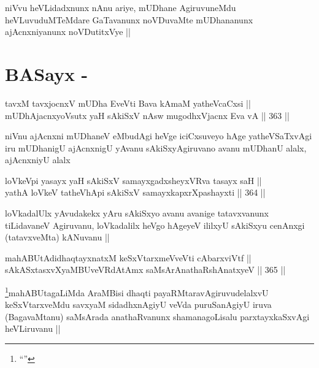\begin{artha}
niVvu heVLidadxnunx nAnu ariye, mUDhane AgiruvuneMdu heVLuvuduMTeMdare
GaTavanunx noVDuvaMte mUDhananunx ajAcnxniyanunx noVDutitxVye ||
\end{artha}

\section*{BASayx -}


\begin{shl}
tavxM tavxjocnxV mUDha EveVti Bava kAmaM yatheVcaCxsi || \\
mUDhAjacnxyoVsutx yaH sAkiSxV nAsw mugodhxV\s jacnx Eva vA ||  363 ||  
\end{shl}

\begin{artha}
niVnu ajAcnxni mUDhaneV eMbudAgi heVge iciCxsuveyo hAge yatheVSaTxvAgi
iru mUDhanigU ajAcnxnigU yAvanu sAkiSxyAgiruvano avanu mUDhanU alalx,
ajAcnxniyU alalx
\end{artha}


\begin{shl}
loVkeV\s pi yasayx yaH sAkiSxV samayxgadxsheyxVRva tasayx saH || \\
yathA loVkeV tatheVhApi sAkiSxV samayxkapxrXpashayxti ||  364 ||  
\end{shl}

\begin{artha}
loVkadalUlx yAvudakekx yAru sAkiSxyo avanu avanige tatavxvanunx
tiLidavaneV Agiruvanu, loVkadalilx heVgo hAgeyeV ililxyU sAkiSxyu
cenAnxgi (tatavxveMta) kANuvanu ||
\end{artha}

\begin{shl}
mahABUtAdidhaqtayxnatxM keSxVtarxmeVveVti cAbarxviVtf || \\
sAkASxtasxvXyaMBUveVRdAtAmx saMsArAnathaRshAnatxyeV ||  365 ||  
\end{shl}

\begin{artha}
\footnote{``\stext''}mahABUtagaLiMda AraMBisi dhaqti payaRMtaravAgiruvudelalxvU
keSxVtarxveMdu savxyaM sidadhxnAgiyU veVda puruSanAgiyU iruva
(BagavaMtanu) saMsArada anathaRvanunx shamanagoLisalu parxtayxkaSxvAgi
heVLiruvanu ||
\end{artha}

